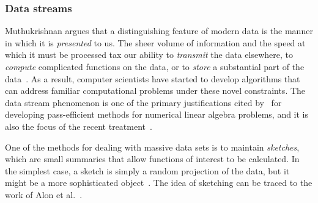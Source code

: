 \documentclass[final]{siamltex}
\newcounter{algorithm}[section]
\newcommand{\pgnotate}[1]{{\color{blue}[#1]}}
\newcommand{\notate}[1]{\textcolor{red}{\textbf{[#1]}}}
\begin{document}
\subsubsection{Data streams}

Muthukrishnan argues that a distinguishing feature of modern data is
the manner in which it is \emph{presented} to us. The sheer volume
of information and the speed at which it must be processed tax our
ability to \emph{transmit} the data elsewhere, to \emph{compute}
complicated functions on the data, or to \emph{store} a substantial
part of the data~\cite[\S3]{Mut05:Data-Streams}.  As a result,
computer scientists have started to develop algorithms that can
address familiar computational problems under these novel
constraints. The data stream phenomenon is one of the primary
justifications cited by~\cite{DKM06:Fast-Monte-Carlo-I} for
developing pass-efficient methods for numerical linear algebra
problems, and it is also the focus of the recent
treatment~\cite{2009_clarkson_woodruff}.

One of the methods for dealing with massive data sets is to maintain \emph{sketches},
which are small summaries that allow functions of interest to be calculated.
In the simplest case, a sketch is simply a random projection of the data,
but it might be a more sophisticated object~\cite[\S5.1]{Mut05:Data-Streams}.
The idea of sketching can be traced to the work of
Alon et al.~\cite{AMS96:Space-Complexity,AGMS99:Tracking-Join}.



%




%
\end{document}
